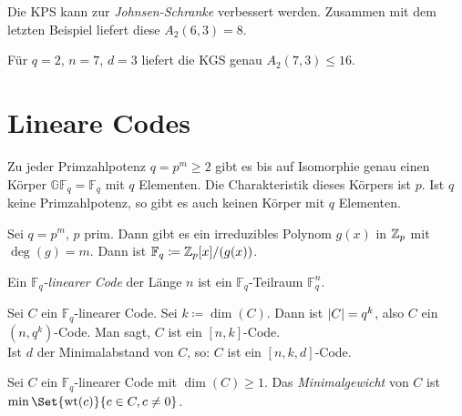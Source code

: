 \documentclass{cheat-sheet}
\newcommand{\F}{\mathbb{F}} %
\newcommand{\GF}{\mathbb{GF}} %
\DeclareMathOperator{\wt}{wt} %
\begin{document}
\begin{samepage}

\begin{bem}
  Die KPS kann zur \emph{Johnsen-Schranke} verbessert werden.
  Zusammen mit dem letzten Beispiel liefert diese $A_2(6, 3) = 8$.
\end{bem}

\begin{bsp}
  Für $q{=}2$, $n{=}7$, $d{=}3$ liefert die KGS genau $A_2(7,3) \leq 16$.
\end{bsp}

\section{Lineare Codes}

\end{samepage}


\begin{bem}
  Zu jeder Primzahlpotenz $q = p^m \geq 2$ gibt es bis auf Isomorphie genau einen Körper $\GF_q = \F_q$ mit $q$ Elementen. Die Charakteristik dieses Körpers ist $p$. Ist $q$ keine Primzahlpotenz, so gibt es auch keinen Körper mit $q$ Elementen.
\end{bem}

\begin{konstr}
  Sei $q = p^m$, $p$ prim. Dann gibt es ein irreduzibles Polynom $g(x)$ in $\mathbb{Z}_p$ mit $\deg(g) = m$.
  Dann ist $\F_q \coloneqq \Z_p[x]/(g(x))$.
\end{konstr}



\begin{defn}
  Ein \emph{$\F_q$-linearer Code} der Länge $n$ ist ein $\F_q$-Teilraum $\F_q^n$.
\end{defn}

\begin{nota}
  Sei $C$ ein $\F_q$-linearer Code.
  Sei $k \coloneqq \dim(C)$.
  Dann ist $\lvert C\rvert = q^k$, also $C$ ein $(n, q^k)$-Code.
  Man sagt, $C$ ist ein $[n, k]$-Code. \\
  Ist $d$ der Minimalabstand von $C$, so: $C$ ist ein $[n,k,d]$-Code.
\end{nota}

\begin{defn}
  Sei $C$ ein $\F_q$-linearer Code mit $\dim(C) \geq 1$.
  Das \emph{Minimalgewicht} von $C$ ist $\min \Set{\wt(c)}{c \in C, c \neq 0}$.
\end{defn}
\end{document}
